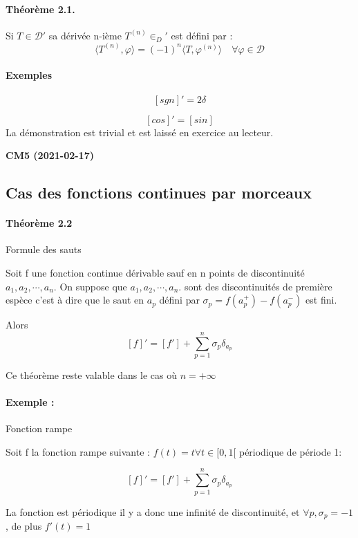 \documentclass[12pt,a4paper]{report}
\newcommand{\fphi}{\quad \forall \varphi \in \mathcal{D}}
\newcommand{\D}{\ensuremath{\mathcal{D}}}
\begin{document}
\paragraph{Théorème 2.1.} Si \(T \in \D'\) sa dérivée n-ième \(T^{(n)} \in _D'\) est défini par :
\[
	\langle T^{(n)}, \varphi \rangle = (-1)^{n} \langle T, \varphi^{(n)} \rangle \fphi
\]

\paragraph{Exemples} \quad \par 

\[
	[sgn]' = 2\delta
\]

\[
	[cos]' = [sin]
\]
La démonstration est trivial et est laissé en exercice au lecteur.

\begin{center}
\textbf{CM5 (2021-02-17)}
\end{center}

\subsection{Cas des fonctions continues par morceaux}

\paragraph{Théorème 2.2} Formule des sauts

Soit f une fonction continue dérivable sauf en n points de discontinuité \(a_1, a_2, \cdots, a_n.\) On suppose que \(a_1, a_2, \cdots, a_n.\) sont des discontinuités de première espèce c'est à dire que le saut en \(a_p\) défini par \(\sigma_p = f(a_p^+) - f(a_p^-)\) est fini.

Alors
\[
	[f]' = [f'] + \sum_{p=1}^n \sigma_p \delta_{a_p}
\]

Ce théorème reste valable dans le cas où \(n = + \infty\)

\paragraph{Exemple :} Fonction rampe

Soit f la fonction rampe suivante : \(f(t) = t \forall t \in [0,1[\) périodique de période 1:

\[
	[f]' = [f'] + \sum_{p=1}^n \sigma_p \delta_{a_p}
\]

La fonction est périodique il y a donc une infinité de discontinuité, et \(\forall p, \sigma_p = -1\), de plus \(f'(t) = 1\)
\end{document}
